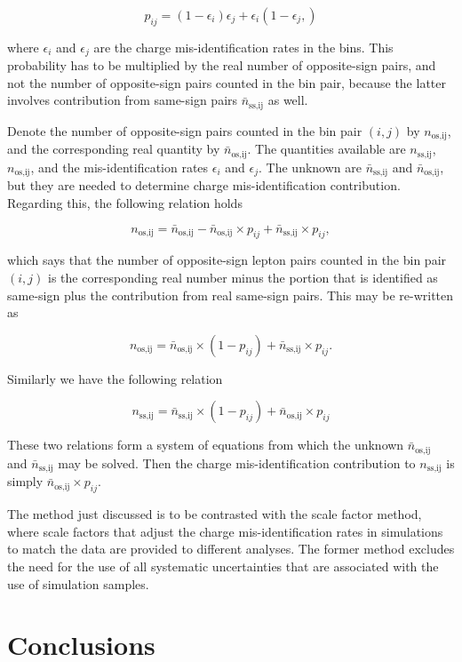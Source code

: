 $$p_{ij} = (1-\epsilon_i)\epsilon_j +  \epsilon_i(1-\epsilon_j,)$$

where $\epsilon_i$ and $\epsilon_j$ are the charge mis-identification rates in
the bins. This probability has to be multiplied by the real number of
opposite-sign pairs, and not the number of opposite-sign pairs counted in the
bin pair, because the latter involves contribution from same-sign pairs
$\bar{n}_{\text{ss,ij}}$ as well.

Denote the number of opposite-sign pairs counted in the bin pair $(i,j)$ by
$n_{\text{os,ij}}$, and the corresponding real quantity by
$\bar{n}_{\text{os,ij}}$. The quantities available are $n_{\text{ss,ij}}$,
$n_{\text{os,ij}}$, and the mis-identification rates $\epsilon_i$ and
$\epsilon_j$. The unknown are $\bar{n}_{\text{ss,ij}}$ and
$\bar{n}_{\text{os,ij}}$, but they are needed to determine charge
mis-identification contribution. Regarding this, the following relation holds

$$n_{\text{os,ij}} = \bar{n}_{\text{os,ij}} - \bar{n}_{\text{os,ij}}\times
	p_{ij} + \bar{n}_{\text{ss,ij}}\times p_{ij},$$

which says that the number of opposite-sign lepton pairs counted in the bin
pair $(i,j)$ is the corresponding real number minus the portion that is
identified as same-sign plus the contribution from real same-sign pairs. This
may be re-written as

$$ n_{\text{os,ij}} = \bar{n}_{\text{os,ij}}\times (1 - p_{ij}) +
	\bar{n}_{\text{ss,ij}} \times p_{ij}. $$

Similarly we have the following relation

$$ n_{\text{ss,ij}} = \bar{n}_{\text{ss,ij}}\times (1 - p_{ij}) +
	\bar{n}_{\text{os,ij}} \times p_{ij} $$

These two relations form a system of equations from which the unknown
$\bar{n}_{\text{os,ij}}$ and $\bar{n}_{\text{ss,ij}}$ may be solved. Then the
charge mis-identification contribution to $n_{\text{ss,ij}}$ is simply
$\bar{n}_{\text{os,ij}}\times p_{ij}$.

The method just discussed is to be contrasted with the scale factor method,
where scale factors that adjust the charge mis-identification rates in
simulations to match the data are provided to different analyses. The former
method excludes the need for the use of all systematic uncertainties that are
associated with the use of simulation samples.


\section{Conclusions}\label{s:chargecon}


